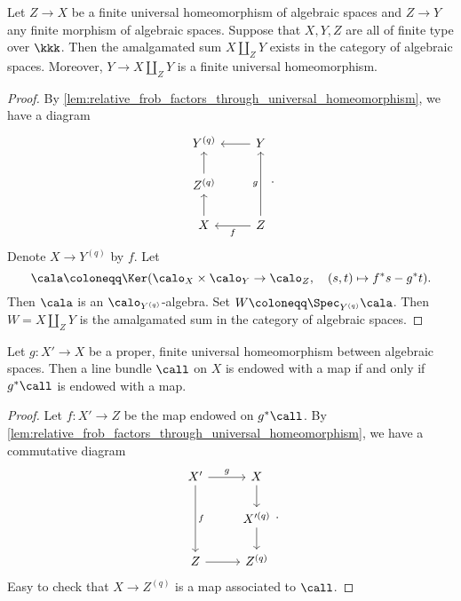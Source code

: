     \begin{corollary}\label{lem:amalgamated_sum_exist_for_finite_universal_homeomorphism_in_char_p}
        Let \(Z \to X\) be a finite universal homeomorphism of algebraic spaces and \(Z \to Y\) any finite morphism of algebraic spaces.
        Suppose that \(X,Y,Z\) are all of finite type over \(\kkk\).
        Then the amalgamated sum \(X \amalg_Z Y\) exists in the category of algebraic spaces.
        Moreover, \(Y \to X \amalg_Z Y\) is a finite universal homeomorphism.
    \end{corollary}
    \begin{proof}
        By \cref{lem:relative_frob_factors_through_universal_homeomorphism}, we have a diagram 
        \[ \begin{tikzcd}
            Y^{(q)}  & Y \arrow[l] \\
            Z^{(q)} \arrow[u] &  \\
            X \arrow[u] & Z \arrow[l, "f"] \arrow[uu, "g"]
        \end{tikzcd}. \]
        Denote \(X \to Y^{(q)}\) by \(f\).
        Let 
        \[ \cala \coloneqq \Ker (\calo_X \times \calo_Y \to \calo_{Z}, \quad (s,t) \mapsto f^*s - g^*t). \]
        Then \(\cala\) is an \(\calo_{Y^{(q)}}\)-algebra.
        Set \(W \coloneqq \Spec_{Y^{(q)}} \cala\).
        Then \(W = X \amalg_Z Y\) is the amalgamated sum in the category of algebraic spaces.
    \end{proof}

    \begin{proposition}\label{prop:EWM_for_non-reduced}
        Let \(g: X' \to X\) be a proper, finite universal homeomorphism between algebraic spaces.
        Then a line bundle \(\call\) on \(X\) is endowed with a map if and only if \(g^*\call\) is endowed with a map.
    \end{proposition}
    \begin{proof}
        Let \(f:X' \to Z\) be the map endowed on \(g^*\call\).
        By \cref{lem:relative_frob_factors_through_universal_homeomorphism}, we have a commutative diagram
        \[ \begin{tikzcd}
            X' \arrow[r, "g"] \arrow[dd, "f"] & X \arrow[d] \\
             & X'^{(q)} \arrow[d]  \\
            Z \arrow[r] & Z^{(q)}
        \end{tikzcd}. \]
        Easy to check that \(X \to Z^{(q)}\) is a map associated to \(\call\).
    \end{proof}

